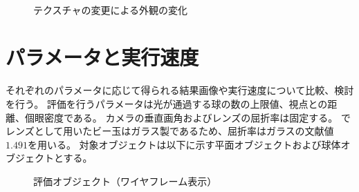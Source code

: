\begin{figure}[htbp]
{\label{FTex3}}
\\
  \caption{テクスチャの変更による外観の変化}
  \label{FTexResults}
\end{figure}




\newpage
\newpage
\section{パラメータと実行速度}
\label{SParameterAndExeTime}

それぞれのパラメータに応じて得られる結果画像や実行速度について比較、検討を行う。
評価を行うパラメータは光が通過する球の数の上限値、視点との距離、個眼密度である。
カメラの垂直画角およびレンズの屈折率は固定する。
でレンズとして用いたビー玉はガラス製であるため、屈折率はガラスの文献値$1.491$を用いる。
対象オブジェクトは以下に示す平面オブジェクトおよび球体オブジェクトとする。
\begin{figure}[htbp]
  \centering
{}
  \caption{評価オブジェクト（ワイヤフレーム表示）}
  \label{FEvalObject}
\end{figure}


